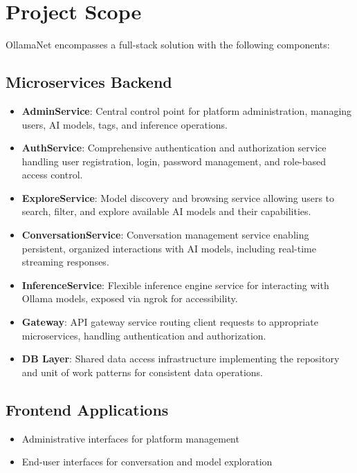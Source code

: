 \section{Project Scope}

OllamaNet encompasses a full-stack solution with the following components:

\subsection{Microservices Backend}
\begin{itemize}
    \item \textbf{AdminService}: Central control point for platform administration, managing users, AI models, tags, and inference operations.
    \item \textbf{AuthService}: Comprehensive authentication and authorization service handling user registration, login, password management, and role-based access control.
    \item \textbf{ExploreService}: Model discovery and browsing service allowing users to search, filter, and explore available AI models and their capabilities.
    \item \textbf{ConversationService}: Conversation management service enabling persistent, organized interactions with AI models, including real-time streaming responses.
    \item \textbf{InferenceService}: Flexible inference engine service for interacting with Ollama models, exposed via ngrok for accessibility.
    \item \textbf{Gateway}: API gateway service routing client requests to appropriate microservices, handling authentication and authorization.
    \item \textbf{DB Layer}: Shared data access infrastructure implementing the repository and unit of work patterns for consistent data operations.
\end{itemize}

\subsection{Frontend Applications}
\begin{itemize}
    \item Administrative interfaces for platform management
    \item End-user interfaces for conversation and model exploration
\end{itemize}

